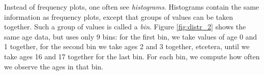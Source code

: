 


Instead of frequency plots, one often see \textit{histograms}. Histograms contain the same information as frequency plots, except that groups of values can be taken together. Such a group of values is called a \textit{bin}. Figure \ref{fig:distr_2} shows the same age data, but uses only 9 bins: for the first bin, we take values of age 0 and 1 together, for the second bin we take ages 2 and 3 together, etcetera, until we take ages 16 and 17 together for the last bin. For each bin, we compute how often we observe the ages in that bin.

